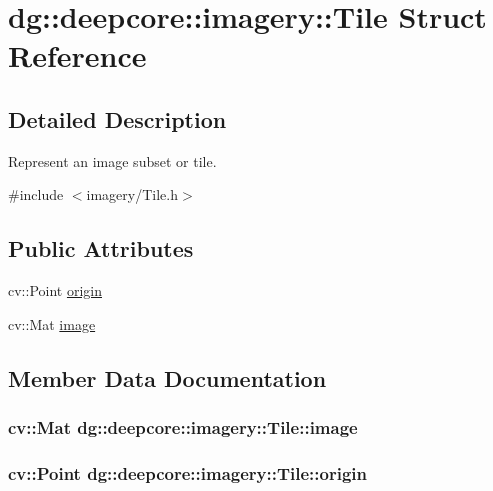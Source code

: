 \hypertarget{structdg_1_1deepcore_1_1imagery_1_1_tile}{}\section{dg\+:\+:deepcore\+:\+:imagery\+:\+:Tile Struct Reference}
\label{structdg_1_1deepcore_1_1imagery_1_1_tile}


\subsection{Detailed Description}
Represent an image subset or tile. 

{\ttfamily \#include $<$imagery/\+Tile.\+h$>$}

\subsection*{Public Attributes}
\begin{DoxyCompactItemize}
\item 
cv\+::\+Point \hyperlink{structdg_1_1deepcore_1_1imagery_1_1_tile_a43379c38440f362c90a4d5f4b3bac8f4}{origin}
\item 
cv\+::\+Mat \hyperlink{structdg_1_1deepcore_1_1imagery_1_1_tile_aa933c35d3ba62939f6c1c7764dcad821}{image}
\end{DoxyCompactItemize}


\subsection{Member Data Documentation}
\subsubsection[{\texorpdfstring{image}{image}}]{\setlength{\rightskip}{0pt plus 5cm}cv\+::\+Mat dg\+::deepcore\+::imagery\+::\+Tile\+::image}\hypertarget{structdg_1_1deepcore_1_1imagery_1_1_tile_aa933c35d3ba62939f6c1c7764dcad821}{}\label{structdg_1_1deepcore_1_1imagery_1_1_tile_aa933c35d3ba62939f6c1c7764dcad821}
\subsubsection[{\texorpdfstring{origin}{origin}}]{\setlength{\rightskip}{0pt plus 5cm}cv\+::\+Point dg\+::deepcore\+::imagery\+::\+Tile\+::origin}\hypertarget{structdg_1_1deepcore_1_1imagery_1_1_tile_a43379c38440f362c90a4d5f4b3bac8f4}{}\label{structdg_1_1deepcore_1_1imagery_1_1_tile_a43379c38440f362c90a4d5f4b3bac8f4}
